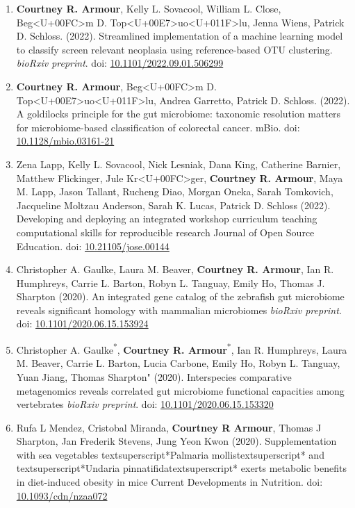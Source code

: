 \documentclass[11pt,a4paper,]{awesome-cv}
\begin{document}
\small
\begin{enumerate}
\item \textbf{Courtney R. Armour}, Kelly L. Sovacool, William L. Close, Beg<U+00FC>m D. Top<U+00E7>uo<U+011F>lu, Jenna Wiens, Patrick D. Schloss. (2022). Streamlined implementation of a machine learning model to classify screen relevant neoplasia using reference-based OTU clustering. \textit{bioRxiv preprint}. doi: \href{https://doi.org/10.1101/2022.09.01.506299}{10.1101/2022.09.01.506299}
\item \textbf{Courtney R. Armour}, Beg<U+00FC>m D. Top<U+00E7>uo<U+011F>lu, Andrea Garretto, Patrick D. Schloss. (2022). A goldilocks principle for the gut microbiome: taxonomic resolution matters for microbiome-based classification of colorectal cancer. mBio. doi: \href{https://doi.org/10.1128/mbio.03161-21}{10.1128/mbio.03161-21}
\item Zena Lapp, Kelly L. Sovacool, Nick Lesniak, Dana King, Catherine Barnier, Matthew Flickinger, Jule Kr<U+00FC>ger, \textbf{Courtney R. Armour}, Maya M. Lapp, Jason Tallant, Rucheng Diao, Morgan Oneka, Sarah Tomkovich, Jacqueline Moltzau Anderson, Sarah K. Lucas, Patrick D. Schloss (2022). Developing and deploying an integrated workshop curriculum teaching computational skills for reproducible research Journal of Open Source Education. doi: \href{https://doi.org/10.21105/jose.00144}{10.21105/jose.00144}
\item Christopher A. Gaulke, Laura M. Beaver, \textbf{Courtney R. Armour}, Ian R. Humphreys, Carrie L. Barton, Robyn L. Tanguay, Emily Ho, Thomas J. Sharpton (2020). An integrated gene catalog of the zebrafish gut microbiome reveals significant homology with mammalian microbiomes \textit{bioRxiv preprint}. doi: \href{https://doi.org/10.1101/2020.06.15.153924}{10.1101/2020.06.15.153924}
\item Christopher A. Gaulke\textsuperscript{*}, \textbf{Courtney R. Armour}\textsuperscript{*}, Ian R. Humphreys, Laura M. Beaver, Carrie L. Barton, Lucia Carbone, Emily Ho, Robyn L. Tanguay, Yuan Jiang, Thomas Sharpton" (2020). Interspecies comparative metagenomics reveals correlated gut microbiome functional capacities among vertebrates \textit{bioRxiv preprint}. doi: \href{https://doi.org/10.1101/2020.06.15.153320}{10.1101/2020.06.15.153320}
\item Rufa L Mendez, Cristobal Miranda, \textbf{Courtney R Armour}, Thomas J Sharpton, Jan Frederik Stevens, Jung Yeon Kwon (2020). Supplementation with sea vegetables textsuperscript{*}Palmaria mollistextsuperscript{*} and textsuperscript{*}Undaria pinnatifidatextsuperscript{*} exerts metabolic benefits in diet-induced obesity in mice Current Developments in Nutrition. doi: \href{https://doi.org/10.1093/cdn/nzaa072}{10.1093/cdn/nzaa072}

\end{enumerate}
\end{document}
